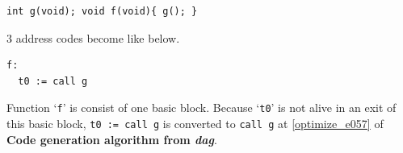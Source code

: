 \begin{Example}
\begin{verbatim}
int g(void); void f(void){ g(); }
\end{verbatim}
3 address codes become like below.
\begin{verbatim}
f:
  t0 := call g
\end{verbatim}
Function `{\tt{f}}' is consist of one basic block.
Because `{\tt{t0}}' is not alive in an exit of this basic block,
{\tt{t0 := call g}} is converted to {\tt{call g}} at
\ref{optimize_e057} of {\bf Code generation algorithm from {\em dag}}.
\end{Example}

\begin{Example}
\label{optimize_e017}
\begin{verbatim}


\end{verbatim}
\end{Example}
